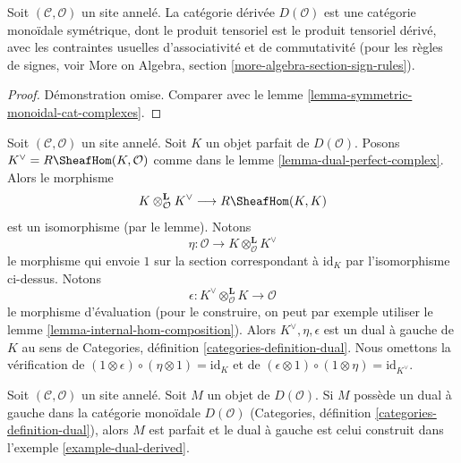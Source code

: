 \begin{lemma}
\label{lemma-symmetric-monoidal-derived}
Soit $(\mathcal{C}, \mathcal{O})$ un site annelé. La catégorie dérivée
$D(\mathcal{O})$ est une catégorie monoïdale symétrique, dont le produit
tensoriel est le produit tensoriel dérivé, avec les contraintes usuelles
d'associativité et de commutativité (pour les règles de signes, voir More on
Algebra, section \ref{more-algebra-section-sign-rules}).
\end{lemma}

\begin{proof}
Démonstration omise. Comparer avec le lemme
\ref{lemma-symmetric-monoidal-cat-complexes}.
\end{proof}

\begin{example}
\label{example-dual-derived}
Soit $(\mathcal{C}, \mathcal{O})$ un site annelé. Soit $K$ un objet parfait
de $D(\mathcal{O})$. Posons $K^\vee = R\SheafHom(K, \mathcal{O})$ comme dans
le lemme \ref{lemma-dual-perfect-complex}. Alors le morphisme
$$
K \otimes_\mathcal{O}^\mathbf{L} K^\vee \longrightarrow R\SheafHom(K, K)
$$
est un isomorphisme (par le lemme). Notons
$$
\eta :
\mathcal{O}
\longrightarrow
K \otimes_\mathcal{O}^\mathbf{L} K^\vee
$$
le morphisme qui envoie $1$ sur la section correspondant à $\text{id}_K$
par l'isomorphisme ci-dessus. Notons
$$
\epsilon : 
K^\vee
\otimes_\mathcal{O}^\mathbf{L} K
\longrightarrow
\mathcal{O}
$$
le morphisme d'évaluation (pour le construire, on peut par exemple utiliser
le lemme \ref{lemma-internal-hom-composition}). Alors
$K^\vee, \eta, \epsilon$ est un dual à gauche de $K$ au sens de Categories,
définition \ref{categories-definition-dual}. Nous omettons la vérification de
$(1 \otimes \epsilon) \circ (\eta \otimes 1) = \text{id}_K$
et de
$(\epsilon \otimes 1) \circ (1 \otimes \eta) =
\text{id}_{K^\vee}$.
\end{example}

\begin{lemma}
\label{lemma-left-dual-derived}
Soit $(\mathcal{C}, \mathcal{O})$ un site annelé. Soit $M$ un objet de
$D(\mathcal{O})$. Si $M$ possède un dual à gauche dans la catégorie monoïdale
$D(\mathcal{O})$ (Categories, définition
\ref{categories-definition-dual}), alors $M$ est parfait et le dual à gauche
est celui construit dans l'exemple \ref{example-dual-derived}.
\end{lemma}

